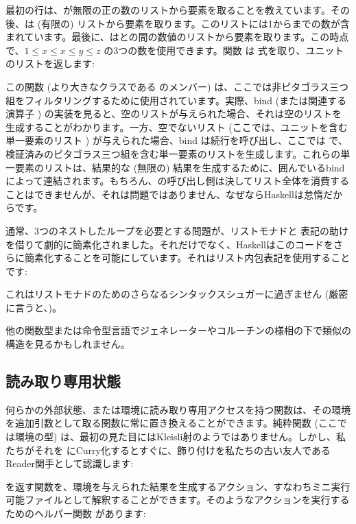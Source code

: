 最初の行は、が無限の正の数のリスト\code{{[}1..{]}}から要素を取ることを教えています。その後、は (有限の) リスト\code{{[}1..z{]}}から要素を取ります。このリストには1からまでの数が含まれています。最後に、はとの間の数値のリストから要素を取ります。この時点で、$1 \leqslant x \leqslant x \leqslant y \leqslant z$ の3つの数を使用できます。関数  は  式を取り、ユニットのリストを返します: 

この関数 (より大きなクラスである  のメンバー) は、ここでは非ピタゴラス三つ組をフィルタリングするために使用されています。実際、bind (または関連する演算子 \code{>>}) の実装を見ると、空のリストが与えられた場合、それは空のリストを生成することがわかります。一方、空でないリスト (ここでは、ユニットを含む単一要素のリスト \code{{[}(){]}}) が与えられた場合、bind は続行を呼び出し、ここでは  で、検証済みのピタゴラス三つ組を含む単一要素のリストを生成します。これらの単一要素のリストは、結果的な (無限の) 結果を生成するために、囲んでいるbindによって連結されます。もちろん、の呼び出し側は決してリスト全体を消費することはできませんが、それは問題ではありません、なぜならHaskellは怠惰だからです。

通常、3つのネストしたループを必要とする問題が、リストモナドと  表記の助けを借りて劇的に簡素化されました。それだけでなく、Haskellはこのコードをさらに簡素化することを可能にしています。それはリスト内包表記を使用することです: 

これはリストモナドのためのさらなるシンタックスシュガーに過ぎません (厳密に言うと、)。

他の関数型または命令型言語でジェネレーターやコルーチンの様相の下で類似の構造を見るかもしれません。

\subsection{読み取り専用状態}

何らかの外部状態、または環境に読み取り専用アクセスを持つ関数は、その環境を追加引数として取る関数に常に置き換えることができます。純粋関数  (ここで  は環境の型) は、最初の見た目にはKleisli射のようではありません。しかし、私たちがそれを
 にCurry化するとすぐに、飾り付けを私たちの古い友人であるReader関手として認識します: 

 を返す関数を、環境を与えられた結果を生成するアクション、すなわちミニ実行可能ファイルとして解釈することができます。そのようなアクションを実行するためのヘルパー関数  があります: 

